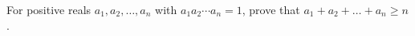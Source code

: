 For positive reals $a_1,a_2,\dots,a_n$ with $a_1a_2\cdots a_n=1$, prove that $a_1+a_2+\dots+a_n\ge n$.
